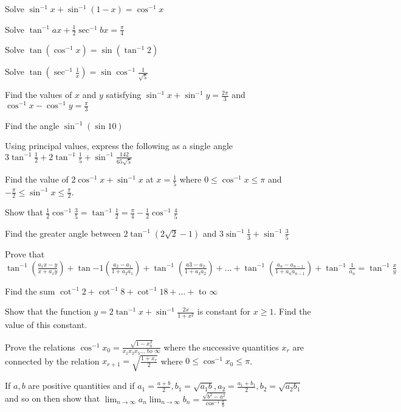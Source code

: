 \item Solve $\sin^{-1}x + \sin^{-1}(1 - x) = \cos^{-1}x$
\item Solve $\tan^{-1}ax + \frac{1}{2}\sec^{-1}bx = \frac{\pi}{4}$
\item Solve $\tan(\cos^{-1}x) = \sin(\tan^{-1}2)$
\item Solve $\tan\left(\sec^{-1}\frac{1}{x}\right) = \sin\cos^{-1}\frac{1}{\sqrt{5}}$
\item Find the values of $x$ and $y$ satisfying $\sin^{-1}x + \sin^{-1}y = \frac{2\pi}{3}$ and $\cos^{-1}x -
    \cos^{-1}y = \frac{\pi}{3}$
\item Find the angle $\sin^{-1}(\sin10)$
\item Using principal values, express the following as a single angle $3\tan^{-1}\frac{1}{2} + 2\tan^{-1}\frac{1}{5} +
    \sin^{-1}\frac{142}{65\sqrt{5}}$
\item Find the value of $2\cos^{-1}x + \sin^{-1}x$ at $x = \frac{1}{5}$ where $0\leq \cos^{-1}x\leq \pi$ and
    $-\frac{\pi}{2}\leq \sin^{-1}x \leq \frac{\pi}{2}$.
\item Show that $\frac{1}{2}\cos^{-1}\frac{3}{5} = \tan^{-1}\frac{1}{2} = \frac{\pi}{4} - \frac{1}{2}\cos^{-1}\frac{4}{5}$
\item Find the greater angle between $2\tan^{-1}(2\sqrt{2} - 1)$ and $3\sin^{-1}\frac{1}{3} + \sin^{-1}\frac{3}{5}$
\item Prove that $\tan^{-1}\left(\frac{a_1x - y}{x + a_1y}\right) + \tan{-1}\left(\frac{a_2 - a_1}{1 + a_2a_1}\right) +
    \tan^{-1}\left(\frac{a3 - a_2}{1 + a_3a_2}\right) + \ldots + \tan^{-1}\left(\frac{a_n - a_{n - 1}}{1 + a_na_{n - 1}}\right) +
    \tan^{-1}\frac{1}{a_n} = \tan^{-1}\frac{x}{y}$
\item Find the sum $\cot^{-1}2 + \cot^{-1}8 + \cot^{-1}18 + \ldots +$ to $\infty$
\item Show that the function $y = 2\tan^{-1}x + \sin^{-1}\frac{2x}{1 + x^2}$ is constant for $x\geq 1.$ Find the value of
    this constant.
\item Prove the relations $\cos^{-1}x_0 = \frac{\sqrt{1 - x_0^2}}{x_1x_2x_3\ldots\text{~to~}\infty}$ where the successive
    quantities $x_r$ are connected by the relation $x_{r + 1} = \sqrt{\frac{1 + x_r}{2}}$ where $0\leq
    \cos^{-1}x_0\leq \pi$.
\item If $a, b$ are positive quantities and if $a_1 = \frac{a + b}{2}, b_1 = \sqrt{a_1b}, a_2 = \frac{a_1 + b_1}{2}, b_2
    = \sqrt{a_2b_1}$ and so on then show that $\lim_{n\to \infty}a_n\lim_{n\to\infty}b_n = \frac{\sqrt{b^2 - a^2}}{\cos^{-1}\frac{a}{b}}$
